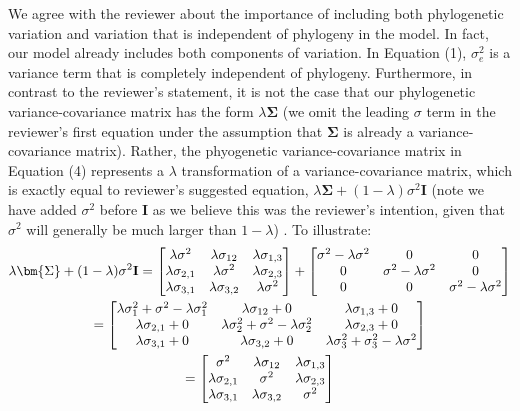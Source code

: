 \documentclass[11pt]{article}
\begin{document}
We agree with the reviewer about the importance of including both phylogenetic variation and variation that is independent of phylogeny in the model. In fact, our model already includes both components of variation. In Equation (1), $\sigma_e^2$ is a variance term that is completely independent of phylogeny. Furthermore, in contrast to the reviewer's statement, it is not  the case that our phylogenetic variance-covariance matrix has the form $\lambda \bm{\Sigma}$ (we omit the leading $\sigma$ term in the reviewer's first equation under the assumption that $\bm{\Sigma}$ is already a variance-covariance matrix). Rather, the phyogenetic variance-covariance matrix in Equation (4) represents a $\lambda$ transformation of a variance-covariance matrix, which is exactly equal to reviewer's suggested equation, $\lambda \bm{\Sigma} + (1 - \lambda)\sigma^2\bm{I}$ (note we have added $\sigma^2$ before $\bm{I}$ as we believe this was the reviewer's intention, given that $\sigma^2$ will generally be much larger than $1-\lambda$) . To illustrate:\\

\begin{multline} \lambda \bm{\Sigma} + (1 - \lambda) \sigma^2{\bf I} =
  \begin{bmatrix}
    \lambda\sigma^2 & \lambda\sigma_{12} & \lambda\sigma_{1,3} \\
    \lambda\sigma_{2,1} & \lambda\sigma^2 & \lambda\sigma_{2,3} \\
    \lambda\sigma_{3,1} & \lambda\sigma_{3,2} & \lambda\sigma^2 \\
  \end{bmatrix}
  +
  \begin{bmatrix}
    \sigma^2 - \lambda\sigma^2 & 0 & 0 \\
    0 & \sigma^2 - \lambda\sigma^2 & 0 \\
    0 & 0 & \sigma^2-\lambda\sigma^2 \\
  \end{bmatrix}
  \\=
  \begin{bmatrix}
    \lambda\sigma_1^2 + \sigma^2 - \lambda\sigma_1^2 & \lambda\sigma_{12} +0 & \lambda\sigma_{1,3} +0\\
    \lambda\sigma_{2,1} +0 & \lambda\sigma_2^2 + \sigma^2 - \lambda\sigma_2^2 & \lambda\sigma_{2,3} +0\\
    \lambda\sigma_{3,1} +0 & \lambda\sigma_{3,2} +0 & \lambda\sigma_3^2 + \sigma_3^2 - \lambda\sigma^2 \\
  \end{bmatrix}
  \\=
  \begin{bmatrix}
    \sigma^2 & \lambda\sigma_{12} & \lambda\sigma_{1,3}\\
    \lambda\sigma_{2,1} & \sigma^2 & \lambda\sigma_{2,3}\\
    \lambda\sigma_{3,1}& \lambda\sigma_{3,2} & \sigma^2\\
  \end{bmatrix}
  \\
\end{multline}
\end{document}
